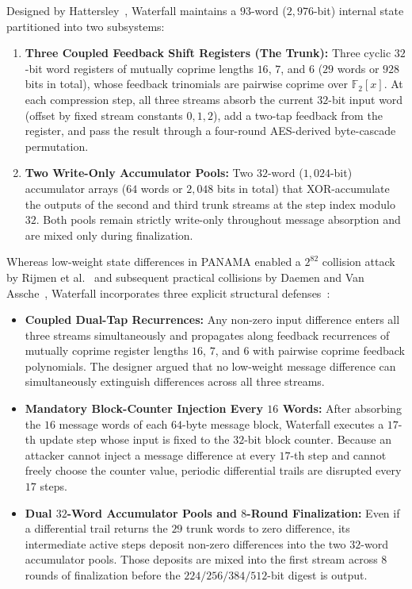 \documentclass[11pt,a4paper]{article}
\theoremstyle{definition}
\theoremstyle{remark}
\newcommand{\Ftwo}{\mathbb{F}_2}
\begin{document}
Designed by Hattersley~\cite{Hat08}, Waterfall maintains a $93$-word ($2{,}976$-bit) internal state partitioned into two subsystems:
\begin{enumerate}[leftmargin=2em]
    \item \textbf{Three Coupled Feedback Shift Registers (The Trunk):} Three cyclic $32$-bit word registers of mutually coprime lengths $16$, $7$, and $6$ ($29$ words or $928$ bits in total), whose feedback trinomials are pairwise coprime over $\Ftwo[x]$. At each compression step, all three streams absorb the current $32$-bit input word (offset by fixed stream constants $0, 1, 2$), add a two-tap feedback from the register, and pass the result through a four-round AES-derived byte-cascade permutation.
    \item \textbf{Two Write-Only Accumulator Pools:} Two $32$-word ($1{,}024$-bit) accumulator arrays ($64$ words or $2{,}048$ bits in total) that XOR-accumulate the outputs of the second and third trunk streams at the step index modulo $32$. Both pools remain strictly write-only throughout message absorption and are mixed only during finalization.
\end{enumerate}

Whereas low-weight state differences in PANAMA enabled a $2^{82}$ collision attack by Rijmen et al.~\cite{RVP01} and subsequent practical collisions by Daemen and Van Assche~\cite{DaemenVanAssche}, Waterfall incorporates three explicit structural defenses~\cite{Hat08}:
\begin{itemize}[leftmargin=2em]
    \item \textbf{Coupled Dual-Tap Recurrences:} Any non-zero input difference enters all three streams simultaneously and propagates along feedback recurrences of mutually coprime register lengths $16$, $7$, and $6$ with pairwise coprime feedback polynomials. The designer argued that no low-weight message difference can simultaneously extinguish differences across all three streams.
    \item \textbf{Mandatory Block-Counter Injection Every $16$ Words:} After absorbing the $16$ message words of each $64$-byte message block, Waterfall executes a $17$-th update step whose input is fixed to the $32$-bit block counter. Because an attacker cannot inject a message difference at every $17$-th step and cannot freely choose the counter value, periodic differential trails are disrupted every $17$ steps.
    \item \textbf{Dual $32$-Word Accumulator Pools and $8$-Round Finalization:} Even if a differential trail returns the $29$ trunk words to zero difference, its intermediate active steps deposit non-zero differences into the two $32$-word accumulator pools. Those deposits are mixed into the first stream across $8$ rounds of finalization before the $224/256/384/512$-bit digest is output.
\end{itemize}
\end{document}
